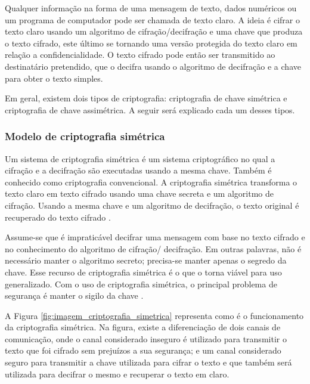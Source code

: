    Qualquer informação na forma de uma mensagem de texto, dados numéricos ou um programa de computador pode ser chamada de texto claro. A ideia é cifrar o texto claro usando um algoritmo de cifração/decifração e uma chave que produza o texto cifrado, este último se tornando uma versão protegida do texto claro em relação a confidencialidade. O texto cifrado pode então ser transmitido ao destinatário pretendido, que o decifra usando o algoritmo de decifração e a chave para obter o texto simples.\cite{beginnig_blockchain_bikramaditya}
    
    Em geral, existem dois tipos de criptografia: criptografia de chave simétrica e criptografia de chave assimétrica. A seguir será explicado cada um desses tipos.

        \subsubsection{Modelo de criptografia simétrica}
        
            Um sistema de criptografia simétrica é um sistema criptográfico no qual a cifração e a decifração são executadas usando a mesma chave. Também é conhecido como criptografia convencional. A criptografia simétrica transforma o texto claro em texto cifrado usando uma chave secreta e um algoritmo de cifração. Usando a mesma chave e um algoritmo de decifração, o texto original é recuperado do texto cifrado \cite{cryptograpy_and_network_stallings}.
            
            Assume-se que é impraticável decifrar uma mensagem com base no texto cifrado e no conhecimento do algoritmo de cifração/ decifração. Em outras palavras, não é necessário manter o algoritmo secreto; precisa-se manter apenas o segredo da chave. Esse recurso de criptografia simétrica é o que o torna viável para uso generalizado. Com o uso de criptografia simétrica, o principal problema de segurança é manter o sigilo da chave \cite{cryptograpy_and_network_stallings}.
            
            A Figura \ref{fig:imagem_criptografia_simetrica} representa como é o funcionamento da criptografia simétrica. Na figura, existe a diferenciação de dois canais de comunicação, onde o canal considerado inseguro é utilizado para transmitir o texto que foi cifrado sem prejuízos a sua segurança; e um canal considerado seguro para transmitir a chave utilizada para cifrar o texto e que também será utilizada para decifrar o mesmo e recuperar o texto em claro.
            
